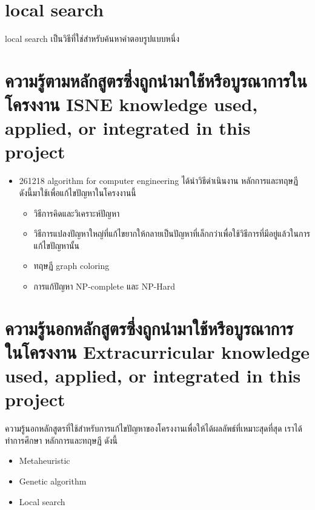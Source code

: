 \section{local search}
local search เป็นวิธีที่ใช่สำหรับค้นหาคำตอบรูปแบบหนึ่ง 


\section{\ifcpe%
ความรู้ตามหลักสูตรซึ่งถูกนำมาใช้หรือบูรณาการในโครงงาน
\else%
ISNE knowledge used, applied, or integrated in this project
\fi
}
\begin{itemize}
  \item 261218 algorithm for computer engineering ได้นำวิธีดำเนินงาน หลักการและทฤษฏี ดังนี้มาใช้เพื่อแก้ไขปัญหาในโครงงานนี้  
  \begin{itemize}
  \item วิธีการคิดและวิเคราะห์ปัญหา
  \item วิธีการแปลงปัญหาใหญ่ที่แก้ไขยากให้กลายเป็นปัญหาที่เล็กกว่าเพื่อใช้วิธีการที่มีอยู่แล้วในการแก้ไขปัญหานั้น
  \item ทฤษฏี graph coloring
  \item การแก้ปัญหา NP-complete และ NP-Hard
  \end{itemize}
\end{itemize}

\section{\ifcpe%
ความรู้นอกหลักสูตรซึ่งถูกนำมาใช้หรือบูรณาการในโครงงาน
\else%
Extracurricular knowledge used, applied, or integrated in this project
\fi
}
ความรู้นอกหลักสูตรที่ใช้สำหรับการแก้ไขปัญหาของโครงงานเพื่อให้ได้ผลลัพธ์ที่เหมาะสุดที่สุด เราได้ทำการศึกษา หลักการและทฤษฏี ดังนี้
\begin{itemize}
  \item Meta­heuristic 
  \item Genetic algorithm
  \item Local search
\end{itemize}
